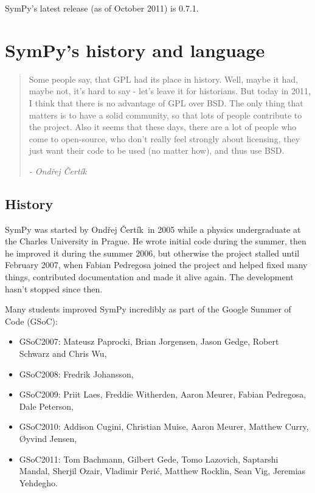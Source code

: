 \documentclass[12pt]{article}
\def\OC{Ond\v rej \v Cert\' ik\ }
\begin{document}
SymPy's latest release (as of October 2011) is 0.7.1.

\section{SymPy's history and language}

\begin{quotation}
Some people say, that GPL had its place in history. Well, maybe
it had, maybe not, it's hard to say - let's leave it for historians.
But today in 2011,  I think that there is no advantage of GPL over
BSD. The only thing that matters is to have a solid
community, so that lots of people contribute to the project. Also it
seems that these days, there are a lot of people who come to
open-source, who don't really feel strongly about licensing, they just
want their code to be used (no matter how), and thus use BSD. 

{\em - \OC}
\end{quotation}

\subsection{History}

SymPy was started by \OC in 2005 while a
physics undergraduate at the Charles University in Prague.
He wrote initial code during the
summer, then he improved it during the summer 2006, but otherwise the project
stalled until February 2007, when
Fabian Pedregosa joined the project and helped fixed many things, contributed
documentation and made it alive again. The development hasn't stopped since
then.

Many students improved SymPy incredibly 
as part of the Google Summer of Code (GSoC):
\begin{itemize}
\item
GSoC2007: Mateusz Paprocki, Brian
Jorgensen, Jason Gedge, Robert Schwarz and Chris Wu,
\item
GSoC2008: Fredrik Johansson,

\item
GSoC2009: Priit Laes, Freddie Witherden, Aaron Meurer,
Fabian Pedregosa, Dale Peterson,

\item
GSoC2010:
Addison Cugini, Christian Muise, Aaron Meurer, Matthew Curry,
{\O}yvind Jensen,

\item
GSoC2011: Tom Bachmann, Gilbert Gede, Tomo Lazovich, Saptarshi Mandal, 
Sherjil Ozair, Vladimir Peri\'c,  Matthew Rocklin, Sean Vig, Jeremias Yehdegho.
\end{itemize}
\end{document}
